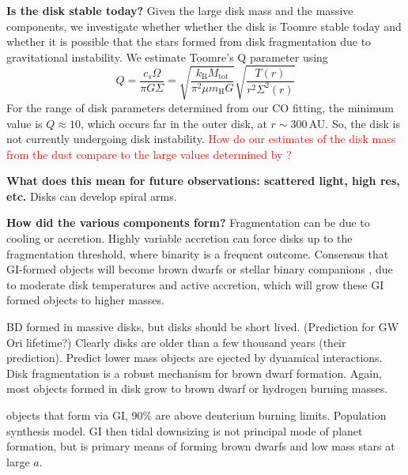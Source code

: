 \documentclass[twocolumn]{aastex61}
\newcommand{\todo}[1]{ \textcolor{red}{#1}}
\begin{document}
\textbf{Is the disk stable today?}
Given the large disk mass and the massive components, we investigate whether whether the disk is Toomre stable today and whether it is possible that the stars formed from disk fragmentation due to gravitational instability. We estimate Toomre's Q parameter using
\begin{equation}
Q = \frac{c_s \Omega}{\pi G \Sigma} = \sqrt{\frac{k_\mathrm{B} M_\mathrm{tot}}{\pi^2 \mu m_\mathrm{H} G}} \sqrt{\frac{T(r)}{r^2 \Sigma^2(r)}}
\end{equation}
For the range of disk parameters determined from our CO fitting, the minimum value is $Q \approx 10$, which occurs far in the outer disk, at $r \sim 300\,$AU. So, the disk is not currently undergoing disk instability. \todo{How do our estimates of the disk mass from the dust compare to the large values determined by \citet{mathieu91,mathieu95}?}


\textbf{What does this mean for future observations: scattered light, high res, etc.}
 Disks can develop spiral arms.



\textbf{How did the various components form?}
Fragmentation can be due to cooling or accretion. Highly variable accretion can force disks up to the fragmentation threshold, where binarity is a frequent outcome. Consensus that GI-formed objects will become brown dwarfs or stellar binary companions \citep{kratter10}, due to moderate disk temperatures and active accretion, which will grow these GI formed objects to higher masses.

\citep{stamatellos09} BD formed in massive disks, but disks should be short lived. (Prediction for GW Ori lifetime?) Clearly disks are older than a few thousand years (their prediction). Predict lower mass objects are ejected by dynamical interactions. Disk fragmentation is a robust mechanism for brown dwarf formation. Again, most objects formed in disk grow to brown dwarf or hydrogen burning masses.

\citep{forgan13} objects that form via GI, 90\% are above deuterium burning limits. Population synthesis model. GI then tidal downsizing is not principal mode of planet formation, but is primary means of forming brown dwarfs and low mass stars at large $a$.
\end{document}
